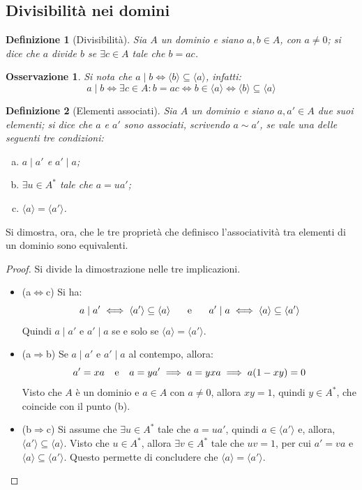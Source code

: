 \documentclass[12pt]{scrartcl}
\theoremstyle{style}
\newtheorem{definizione}{Definizione}[section]
\newtheorem{osservazione}{Osservazione}[section]
\numberwithin{equation}{subsection}
\begin{document}
\subsection{Divisibilit\`a nei domini}

\begin{definizione}
	[Divisibilit\`a]
	Sia $A$ un dominio e siano $a,b \in A$, con $a\neq 0$; si dice che $a$ \textit{divide} $b$ se $\exists c \in A$ tale che $b=ac$.
\end{definizione}
\begin{osservazione}
Si nota che $a  \mid b \iff \langle b \rangle\subseteq \langle a \rangle$, infatti:
\[
a \mid b \iff\exists c \in A : b = ac \iff b \in \langle a \rangle \iff \langle b \rangle\subseteq \langle a \rangle
\] 
\end{osservazione}
\begin{definizione}
	[Elementi associati]
	Sia $A$ un dominio e siano $a, a' \in A$ due suoi elementi; si dice che $a$ e $a'$ sono \textit{associati}, scrivendo $a \sim a'$, se vale una delle seguenti tre condizioni:
	\begin{enumerate}[(a).]
		\item $a \mid a'$ e $a'  \mid a$;
		\item $\exists u \in A^*$ tale che $ a= ua'$;
		\item $\langle a \rangle=\langle a' \rangle$.
	\end{enumerate}
\end{definizione}
\noindent Si dimostra, ora, che le tre propriet\`a che definisco l'associativit\`a tra elementi di un dominio sono equivalenti.
\begin{proof}
	Si divide la dimostrazione nelle tre implicazioni.
	\begin{itemize}
		\item (a$\Leftrightarrow$c) Si ha:
			\[
			a  \mid a' \iff \langle a' \rangle\subseteq \langle a \rangle \hspace{.5cm}  \text{ e } \hspace{.5cm} a' \mid a \iff\langle a \rangle\subseteq \langle a' \rangle
			\] 
			Quindi $a \mid a'$ e $a' \mid a$ se e solo se $\langle a \rangle=\langle a' \rangle$.
		\item (a$\Rightarrow $b) Se $a  \mid a'$ e $a'  \mid a$ al contempo, allora:
			\[
			a'=xa \hspace{.25cm} \text{ e } \hspace{.25cm} a = y a' \implies a = yxa \implies a (1-xy) = 0
			\] 
			Visto che $A$ \`e un dominio e $a\in A$ con $a\neq 0$, allora $xy=  1$, quindi $y \in A^*$, che coincide con il punto (b).
		\item (b$\Rightarrow $c) Si assume che $\exists u \in A^* $ tale che $ a=ua'$, quindi $a \in \langle a' \rangle$ e, allora, $\langle a' \rangle\subseteq \langle a \rangle$.
			Visto che $u\in A^*$, allora $\exists v \in A^*$ tale che $uv=  1$, per cui $a'= va$ e $\langle a \rangle\subseteq \langle a' \rangle$.
			Questo permette di concludere che $\langle a \rangle=\langle a' \rangle$.
	\end{itemize}
\end{proof}
\end{document}
